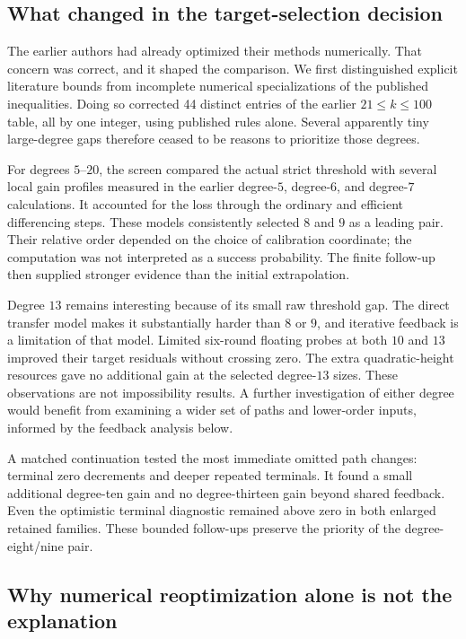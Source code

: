 \documentclass[11pt,letterpaper]{article}
\numberwithin{equation}{section}
\begin{document}
\subsection{What changed in the target-selection decision}

The earlier authors had already optimized their methods numerically.
That concern was correct, and it shaped the comparison. We first
distinguished explicit literature bounds from incomplete numerical
specializations of the published inequalities. Doing so corrected 44
distinct entries of the earlier $21\le k\le100$ table, all by one integer,
using published rules alone. Several apparently tiny large-degree gaps
therefore ceased to be reasons to prioritize those degrees.

For degrees $5$--$20$, the screen compared the actual strict threshold with
several local gain profiles measured in the earlier degree-$5$, degree-$6$,
and degree-$7$ calculations. It accounted for the loss through the ordinary
and efficient differencing steps. These models consistently selected $8$
and $9$ as a leading pair. Their relative order depended on the choice of
calibration coordinate; the computation was not interpreted as a success
probability. The finite follow-up then supplied stronger evidence than the
initial extrapolation.

Degree $13$ remains interesting because of its small raw threshold gap.
The direct transfer model makes it substantially harder than $8$ or $9$,
and iterative feedback is a limitation of that model. Limited six-round
floating probes at both $10$ and $13$ improved their target residuals
without crossing zero. The extra quadratic-height resources gave no
additional gain at the selected degree-$13$ sizes. These observations
are not impossibility results. A further investigation of either degree
would benefit from examining a wider set of paths and lower-order inputs,
informed by the feedback analysis below.

A matched continuation tested the most immediate omitted path changes:
terminal zero decrements and deeper repeated terminals. It found a small
additional degree-ten gain and no degree-thirteen gain beyond shared
feedback. Even the optimistic terminal diagnostic remained above zero in
both enlarged retained families. These bounded follow-ups preserve the
priority of the degree-eight/nine pair.

\subsection{Why numerical reoptimization alone is not the explanation}
\end{document}
